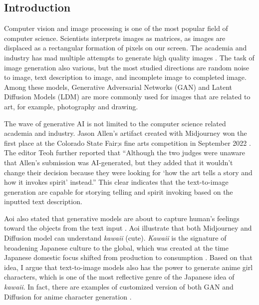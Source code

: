 \subsection*{Introduction}
\par
Computer vision and image processing is one of the most popular field of computer science. 
Scientists interprets images as matrices, as images are displaced as a rectangular formation of pixels on our screen.
The academia and industry has mad multiple attempts to generate high quality images
\cite{
    pmlr-v37-gregor15, 
    Qiao_2019_CVPR, 
    NEURIPS2019_1d72310e, 
    NIPS2016_b1301141,
    Goodfellow2020Generative,
    Rombach2022High,
    He_2022_CVPR,
}.
The task of image generation also various,
but the most studied directions are 
random noise to image,
text description to image,
and incomplete image to completed image.
Among these models, Generative Adversarial Networks (GAN) \cite{Goodfellow2020Generative} and Latent Diffusion Models (LDM) \cite{Rombach2022High} are more commonly used for images that are related to art, for example, photography and drawing.

\par
The wave of generative AI is not limited to the computer science related academia and industry. 
Jason Allen's artifact created with Midjourney\cite{Midjourney} won the first place at the Colorado State Fair;s fine arts competition in September 2022 \cite{Teoh2022Art}.
The editor Teoh \cites{Teoh2022Art} further reported that 
``Although the two judges were unaware that Allen's submission was AI-generated, but they added that it wouldn't change their decision because they were looking for `how the art tells a story and how it invokes spirit' instead.''
This clear indicates that the text-to-image generation are capable for storying telling and spirit invoking based on the inputted text description.

\par
Aoi also stated that generative models are about to capture human's feelings toward the objects from the text input \cite{Aoi2022Stable}.
Aoi illustrate that both Midjourney and Diffusion model can understand
{\it kawaii} (cute).
{\it Kawaii} is the signature of broadening Japanese culture to the global,
which was created at the time Japanese domestic focus shifted from production to consumption \cite{Yano2013Pink}.
Based on that idea,
I argue that text-to-image models also has the power to generate anime girl characters,
which is one of the most reflective genre of the Japanese idea of {\it kawaii}.
In fact, there are examples of customized version of both GAN and Diffusion for anime character generation
\cite{
    Jin2017Towards,
    Ruan2022Anime,
    WaifuDiffusion,
    nizan2020council,
    chong2021gans,
    chong2021jojogan,
}.
